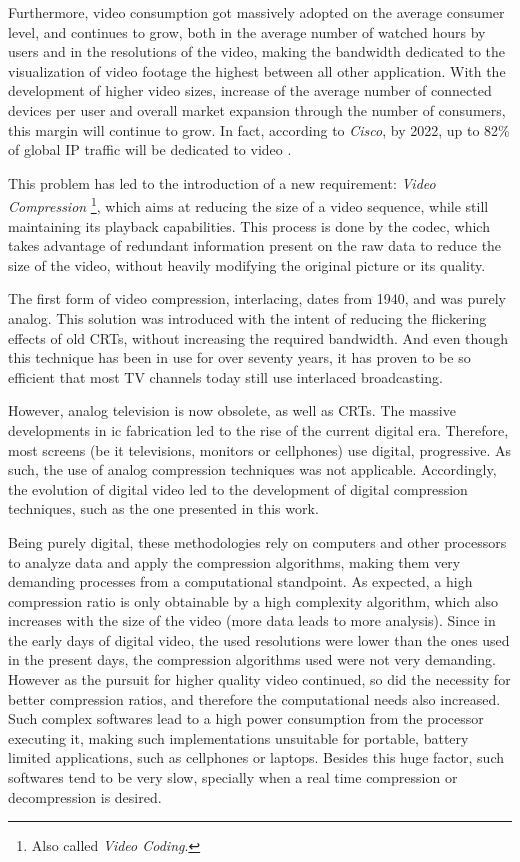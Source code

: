 Furthermore, video consumption got massively adopted on the average consumer level, and continues to grow, both in the average number of watched hours by users and in the resolutions of the video, making the bandwidth dedicated to the visualization of video footage the highest between all other application. With the development of higher video sizes, increase of the average number of connected devices per user and overall market expansion through the number of consumers, this margin will continue to grow. In fact, according to \emph{Cisco}, by 2022, up to 82\% of global IP traffic will be dedicated to video \cite[Trends~1~\&~4]{CiscoVisualNetworking}.

This problem has led to the introduction of a new requirement: \emph{Video Compression} \footnote{Also called \textit{Video Coding}.}, which aims at reducing the size of a video sequence, while still maintaining its playback capabilities. This process is done by the \Gls{codec}, which takes advantage of redundant information present on the raw data to reduce the size of the video, without heavily modifying the original picture or its quality. 

The first form of video compression, \gls{interlacing}, dates from 1940, and was purely analog. This solution was introduced with the intent of reducing the flickering effects of old CRTs, without increasing the required bandwidth. And even though this technique has been in use for over seventy years, it has proven to be so efficient that most TV channels today still use interlaced broadcasting.

However, analog television is now obsolete, as well as CRTs. The massive developments in \Gls{ic} fabrication led to the rise of the current digital era. Therefore, most screens (be it televisions, monitors or cellphones) use digital, \gls{progressive}. As such, the use of analog compression techniques was not applicable. Accordingly, the evolution of digital video led to the development of digital compression techniques, such as the one presented in this work.

Being purely digital, these methodologies rely on computers and other processors to analyze data and apply the compression algorithms, making them very demanding processes from a computational standpoint. As expected, a high compression ratio is only obtainable by a high complexity algorithm, which also increases with the size of the video (more data leads to more analysis). Since in the early days of digital video, the used resolutions were lower than the ones used in the present days, the compression algorithms used were not very demanding. However as the pursuit for higher quality video continued, so did the necessity for better compression ratios, and therefore the computational needs also increased. Such complex softwares lead to a high power consumption from the processor executing it, making such implementations unsuitable for portable, battery limited applications, such as cellphones or laptops. Besides this huge factor, such softwares tend to be very slow, specially when a real time compression or decompression is desired.

